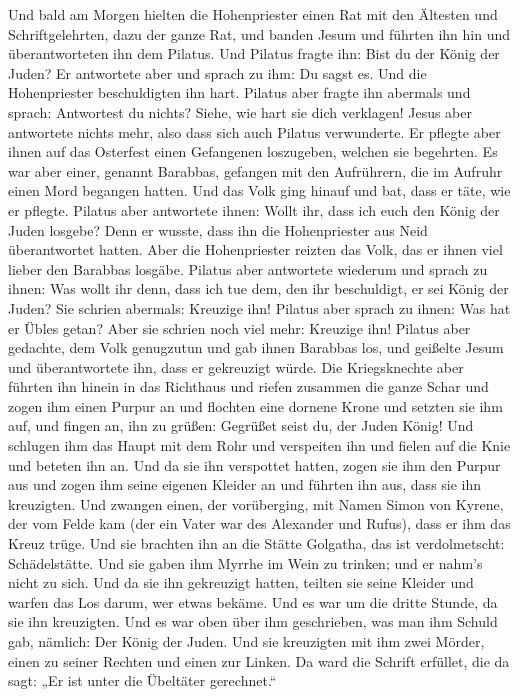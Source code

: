  Und bald am Morgen hielten die Hohenpriester einen Rat
mit den Ältesten und Schriftgelehrten, dazu der ganze Rat, und banden
Jesum und führten ihn hin und überantworteten ihn dem Pilatus.
 Und Pilatus fragte ihn: Bist du der König der Juden? Er
antwortete aber und sprach zu ihm: Du sagst es.  Und die
Hohenpriester beschuldigten ihn hart.  Pilatus aber fragte
ihn abermals und sprach: Antwortest du nichts? Siehe, wie hart sie dich
verklagen!  Jesus aber antwortete nichts mehr, also dass
sich auch Pilatus verwunderte.  Er pflegte aber ihnen auf
das Osterfest einen Gefangenen loszugeben, welchen sie begehrten.
 Es war aber einer, genannt Barabbas, gefangen mit den
Aufrührern, die im Aufruhr einen Mord begangen hatten. 
Und das Volk ging hinauf und bat, dass er täte, wie er pflegte.
 Pilatus aber antwortete ihnen: Wollt ihr, dass ich euch
den König der Juden losgebe?  Denn er wusste, dass ihn
die Hohenpriester aus Neid überantwortet hatten.  Aber
die Hohenpriester reizten das Volk, das er ihnen viel lieber den
Barabbas losgäbe.  Pilatus aber antwortete wiederum und
sprach zu ihnen: Was wollt ihr denn, dass ich tue dem, den ihr
beschuldigt, er sei König der Juden?  Sie schrien
abermals: Kreuzige ihn!  Pilatus aber sprach zu ihnen:
Was hat er Übles getan? Aber sie schrien noch viel mehr: Kreuzige ihn!
 Pilatus aber gedachte, dem Volk genugzutun und gab ihnen
Barabbas los, und geißelte Jesum und überantwortete ihn, dass er
gekreuzigt würde.  Die Kriegsknechte aber führten ihn
hinein in das Richthaus und riefen zusammen die ganze Schar
 und zogen ihm einen Purpur an und flochten eine dornene
Krone und setzten sie ihm auf,  und fingen an, ihn zu
grüßen: Gegrüßet seist du, der Juden König!  Und schlugen
ihm das Haupt mit dem Rohr und verspeiten ihn und fielen auf die Knie
und beteten ihn an.  Und da sie ihn verspottet hatten,
zogen sie ihm den Purpur aus und zogen ihm seine eigenen Kleider an und
führten ihn aus, dass sie ihn kreuzigten.  Und zwangen
einen, der vorüberging, mit Namen Simon von Kyrene, der vom Felde kam
(der ein Vater war des Alexander und Rufus), dass er ihm das Kreuz
trüge.  Und sie brachten ihn an die Stätte Golgatha, das
ist verdolmetscht: Schädelstätte.  Und sie gaben ihm
Myrrhe im Wein zu trinken; und er nahm's nicht zu sich. 
Und da sie ihn gekreuzigt hatten, teilten sie seine Kleider und warfen
das Los darum, wer etwas bekäme.  Und es war um die
dritte Stunde, da sie ihn kreuzigten.  Und es war oben
über ihm geschrieben, was man ihm Schuld gab, nämlich: Der König der
Juden.  Und sie kreuzigten mit ihm zwei Mörder, einen zu
seiner Rechten und einen zur Linken.  Da ward die Schrift
erfüllet, die da sagt: „Er ist unter die Übeltäter gerechnet.``

